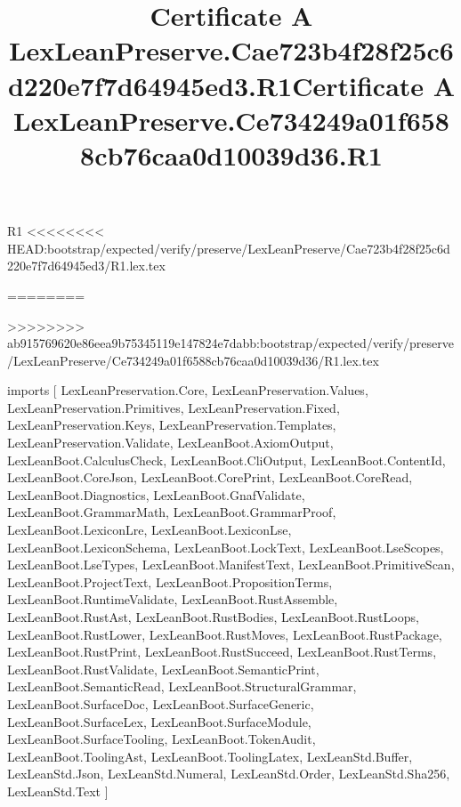 \begin{lexlean}{R1}
<<<<<<<< HEAD:bootstrap/expected/verify/preserve/LexLeanPreserve/Cae723b4f28f25c6d220e7f7d64945ed3/R1.lex.tex
\title{Certificate A LexLeanPreserve.Cae723b4f28f25c6d220e7f7d64945ed3.R1}
========
\title{Certificate A LexLeanPreserve.Ce734249a01f6588cb76caa0d10039d36.R1}
>>>>>>>> ab915769620e86eea9b75345119e147824e7dabb:bootstrap/expected/verify/preserve/LexLeanPreserve/Ce734249a01f6588cb76caa0d10039d36/R1.lex.tex
\begin{coremodule}
imports [
  LexLeanPreservation.Core,
  LexLeanPreservation.Values,
  LexLeanPreservation.Primitives,
  LexLeanPreservation.Fixed,
  LexLeanPreservation.Keys,
  LexLeanPreservation.Templates,
  LexLeanPreservation.Validate,
  LexLeanBoot.AxiomOutput,
  LexLeanBoot.CalculusCheck,
  LexLeanBoot.CliOutput,
  LexLeanBoot.ContentId,
  LexLeanBoot.CoreJson,
  LexLeanBoot.CorePrint,
  LexLeanBoot.CoreRead,
  LexLeanBoot.Diagnostics,
  LexLeanBoot.GnafValidate,
  LexLeanBoot.GrammarMath,
  LexLeanBoot.GrammarProof,
  LexLeanBoot.LexiconLre,
  LexLeanBoot.LexiconLse,
  LexLeanBoot.LexiconSchema,
  LexLeanBoot.LockText,
  LexLeanBoot.LseScopes,
  LexLeanBoot.LseTypes,
  LexLeanBoot.ManifestText,
  LexLeanBoot.PrimitiveScan,
  LexLeanBoot.ProjectText,
  LexLeanBoot.PropositionTerms,
  LexLeanBoot.RuntimeValidate,
  LexLeanBoot.RustAssemble,
  LexLeanBoot.RustAst,
  LexLeanBoot.RustBodies,
  LexLeanBoot.RustLoops,
  LexLeanBoot.RustLower,
  LexLeanBoot.RustMoves,
  LexLeanBoot.RustPackage,
  LexLeanBoot.RustPrint,
  LexLeanBoot.RustSucceed,
  LexLeanBoot.RustTerms,
  LexLeanBoot.RustValidate,
  LexLeanBoot.SemanticPrint,
  LexLeanBoot.SemanticRead,
  LexLeanBoot.StructuralGrammar,
  LexLeanBoot.SurfaceDoc,
  LexLeanBoot.SurfaceGeneric,
  LexLeanBoot.SurfaceLex,
  LexLeanBoot.SurfaceModule,
  LexLeanBoot.SurfaceTooling,
  LexLeanBoot.TokenAudit,
  LexLeanBoot.ToolingAst,
  LexLeanBoot.ToolingLatex,
  LexLeanStd.Buffer,
  LexLeanStd.Json,
  LexLeanStd.Numeral,
  LexLeanStd.Order,
  LexLeanStd.Sha256,
  LexLeanStd.Text
]


\end{coremodule}
\end{lexlean}
